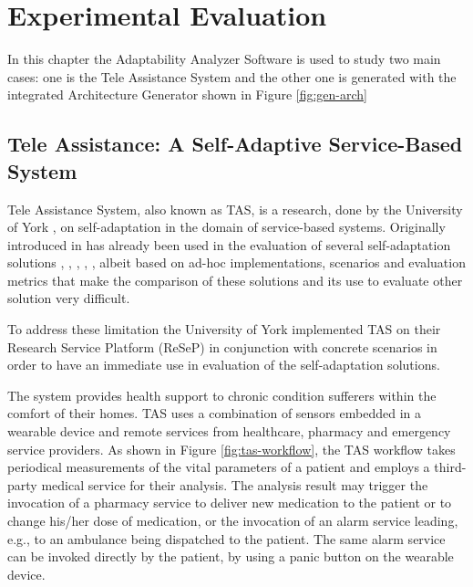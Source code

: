\chapter{Experimental Evaluation}
\label{cap:evaluation}

In this chapter the Adaptability Analyzer Software is used to study two main cases: one is the Tele Assistance System\cite{teleassist} and the other one is generated with the integrated Architecture Generator shown in Figure \ref{fig:gen-arch}

\section{Tele Assistance: A Self-Adaptive Service-Based System}
Tele Assistance System, also known as TAS, is a research, done by the University of York \cite{teleassist}, on self-adaptation in the domain of service-based systems. Originally introduced in \cite{valid-web-serv} has already been used in the evaluation of several self-adaptation solutions \cite{valid-web-serv}, \cite{sas-quant-ver}, \cite{dyn-qos-manage}, \cite{mod-evo-conf}, \cite{conq-compl}, albeit based on ad-hoc implementations, scenarios and evaluation metrics that make the comparison of these solutions and its use to evaluate other solution very difficult.

To address these limitation the University of York implemented TAS on their Research Service Platform (ReSeP) in conjunction with concrete scenarios in order to have an immediate use in evaluation of the self-adaptation solutions.

The system provides health support to chronic condition sufferers within the comfort of their homes. TAS uses a combination of sensors embedded in a wearable device and remote services from healthcare, pharmacy and emergency service providers. As shown in Figure \ref{fig:tas-workflow}, the TAS workflow takes periodical measurements of the vital parameters of a patient and employs a third-party medical service for their analysis. The analysis result may trigger the invocation of a pharmacy service to deliver new medication to the patient or to change his/her dose of medication, or the invocation of an alarm service leading, e.g., to an ambulance being dispatched to the patient. The same alarm service can be invoked directly by the patient, by using a panic button on the wearable device.

